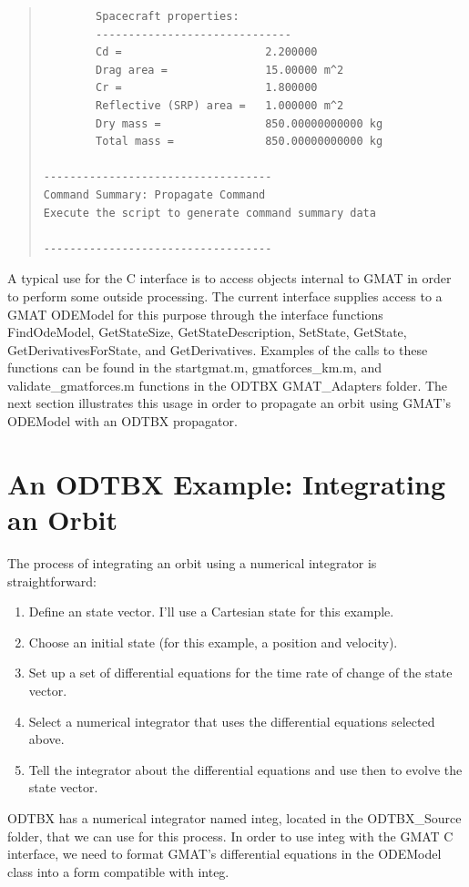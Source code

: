 \documentclass[letterpaper,10pt]{article}
\begin{document}
\begin{quote}
\begin{verbatim}
        Spacecraft properties:
        ------------------------------
        Cd =                      2.200000
        Drag area =               15.00000 m^2
        Cr =                      1.800000
        Reflective (SRP) area =   1.000000 m^2
        Dry mass =                850.00000000000 kg
        Total mass =              850.00000000000 kg

-----------------------------------
Command Summary: Propagate Command
Execute the script to generate command summary data

-----------------------------------
\end{verbatim}
\end{quote}

A typical use for the C interface is to access objects internal to GMAT in order to perform some outside processing.  The current interface supplies access to a GMAT ODEModel for this purpose through the interface functions FindOdeModel, GetStateSize, GetStateDescription, SetState, GetState, GetDerivativesForState, and GetDerivatives.  Examples of the calls to these functions can be found in the startgmat.m, gmatforces\_km.m, and validate\_gmatforces.m functions in the ODTBX GMAT\_Adapters folder.  The next section illustrates this usage in order to propagate an orbit using GMAT's ODEModel with an ODTBX propagator.

\section{An ODTBX Example: Integrating an Orbit}

The process of integrating an orbit using a numerical integrator is straightforward:

\begin{enumerate}
\item Define an state vector.  I'll use a Cartesian state for this example.
\item Choose an initial state (for this example, a position and velocity).
\item Set up a set of differential equations for the time rate of change of the state vector.
\item Select a numerical integrator that uses the differential equations selected above.
\item Tell the integrator about the differential equations and use then to evolve the state vector.
\end{enumerate}

ODTBX has a numerical integrator named integ, located in the ODTBX\_Source folder, that we can use for this process.  In order to use integ with the GMAT C interface, we need to format GMAT's differential equations in the ODEModel class into a form compatible with integ.
\end{document}
